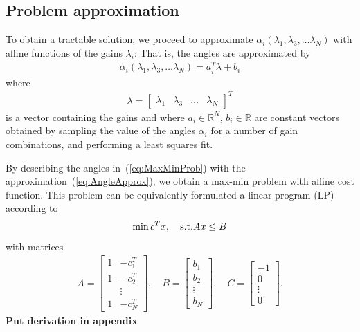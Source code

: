 \documentclass[conference,10pt]{IEEEtran}
\begin{document}
\subsection{Problem approximation}

To obtain a tractable solution, we proceed to approximate $\alpha_i(\lambda_1,\lambda_3,\dots\lambda_N)$ with affine functions of the gains $\lambda_i$: That is, the angles are approximated by
\begin{align}
\label{eq:AngleApprox}
\tilde{\alpha}_i(\lambda_1,\lambda_3,\dots\lambda_N)
= a_i^T\lambda + b_i
\end{align}
where
\begin{align*}
\lambda =
\begin{bmatrix}
\lambda_1 & \lambda_3 & \dots & \lambda_N
\end{bmatrix}^T
\end{align*}
is a vector containing the gains and where $a_i\in\mathbb{R}^N$, $b_i\in\mathbb{R}$ are constant vectors obtained by sampling the value of the angles
$\alpha_i$ for a number of gain combinations, and performing a least squares fit.



By describing the angles in~(\ref{eq:MaxMinProb})
with the approximation~(\ref{eq:AngleApprox}), we obtain a max-min problem with affine cost function. This problem can be equivalently formulated a linear program (LP) according to
\begin{align}
\label{eq:MaxMinProbApprox}
\min c^Tx,\quad {\rm s.t.} Ax\le B
\end{align}
with matrices
\begin{align*}
A =
\begin{bmatrix}
1 & -c^T_1\\
1 & -c^T_2\\
 & \vdots \\
1 & -c^T_N
\end{bmatrix},\quad
B =
\begin{bmatrix}
b_1\\
b_2\\
\vdots \\
b_N
\end{bmatrix},\quad
C =
\begin{bmatrix}
-1\\
0\\
\vdots \\
0
\end{bmatrix}.
\end{align*}
{\bf Put derivation in appendix}
\end{document}

